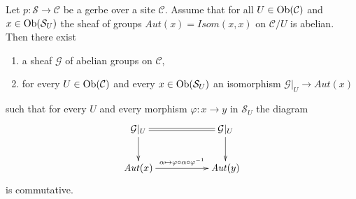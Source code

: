 \begin{lemma}
\label{lemma-gerbe-abelian-auts}
Let $p : \mathcal{S} \to \mathcal{C}$ be a gerbe over a site $\mathcal{C}$.
Assume that for all $U \in \mathop{\mathrm{Ob}}\nolimits(\mathcal{C})$ and $x \in \mathop{\mathrm{Ob}}\nolimits(\mathcal{S}_U)$
the sheaf of groups $\mathit{Aut}(x) = \mathit{Isom}(x, x)$ on $\mathcal{C}/U$
is abelian. Then there exist
\begin{enumerate}
\item a sheaf $\mathcal{G}$ of abelian groups on $\mathcal{C}$,
\item for every $U \in \mathop{\mathrm{Ob}}\nolimits(\mathcal{C})$ and every $x \in \mathop{\mathrm{Ob}}\nolimits(\mathcal{S}_U)$
an isomorphism $\mathcal{G}|_U \to \mathit{Aut}(x)$
\end{enumerate}
such that for every $U$ and every morphism $\varphi : x \to y$
in $\mathcal{S}_U$ the diagram
$$
\xymatrix{
\mathcal{G}|_U \ar[d] \ar@{=}[rr] & & \mathcal{G}|_U \ar[d] \\
\mathit{Aut}(x)
\ar[rr]^{\alpha \mapsto \varphi \circ \alpha \circ \varphi^{-1}} & &
\mathit{Aut}(y)
}
$$
is commutative.
\end{lemma}

